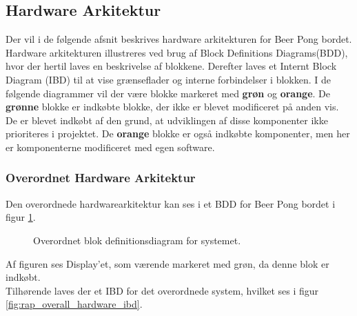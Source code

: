 \documentclass[Rapport/Rapport_main.tex]{subfiles}
\begin{document}
\subsection{Hardware Arkitektur}
Der vil i de følgende afsnit beskrives hardware arkitekturen for Beer Pong bordet. Hardware arkitekturen illustreres ved brug af Block Definitions Diagrams(BDD), hvor der hertil laves en beskrivelse af blokkene. Derefter laves et Internt Block Diagram (IBD) til at vise grænseflader og interne forbindelser i blokken. I de følgende diagrammer vil der være blokke markeret med \textbf{grøn} og \textbf{orange}. De \textbf{grønne} blokke er indkøbte blokke, der ikke er blevet modificeret på anden vis. De er blevet indkøbt af den grund, at udviklingen af disse komponenter ikke prioriteres i projektet. De \textbf{orange} blokke er også indkøbte komponenter, men her er komponenterne modificeret med egen software.
\subsubsection{Overordnet Hardware Arkitektur}
Den overordnede hardwarearkitektur kan ses i et BDD for Beer Pong bordet i figur \ref{fig:rap_overall_hardware_bdd}.

\begin{figure}[H]
    \centering
    \caption{Overordnet blok definitionsdiagram for systemet.}
    \label{fig:rap_overall_hardware_bdd}
\end{figure}
Af figuren ses Display'et, som værende markeret med grøn, da denne blok er indkøbt.\\
Tilhørende laves der et IBD for det overordnede system, hvilket ses i figur \ref{fig:rap_overall_hardware_ibd}.
\end{document}
